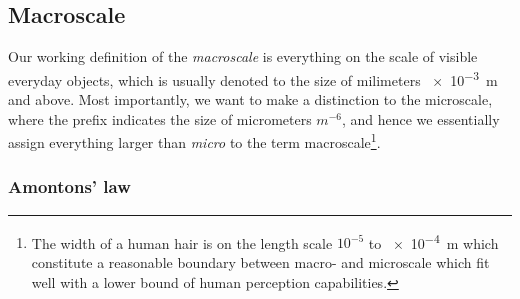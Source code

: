 









\subsection{Macroscale}

Our working definition of the \textit{macroscale} is everything on the scale of visible everyday objects, which is usually denoted to the size of milimeters \SI{e-3}{\metre} and above. Most importantly, we want to make a distinction to the microscale, where the prefix indicates the size of micrometers $m^{-6}$, and hence we essentially assign everything larger than \textit{micro} to the term macroscale\footnote{The width of a human hair is on the length scale $10^{-5}$ to \SI{e-4}{m} which constitute a reasonable boundary between macro- and microscale which fit well with a lower bound of human perception capabilities.}.

\subsubsection{Amontons’ law}
 
